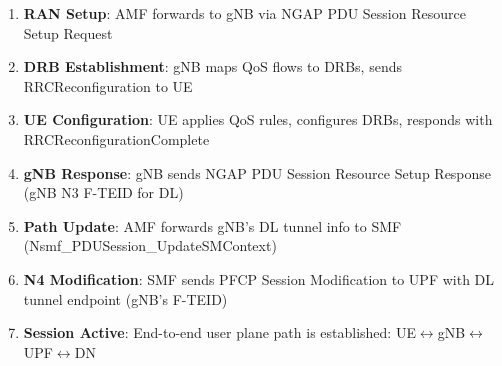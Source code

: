 \begin{enumerate}
  \begin{itemize}
  \tightlist
  \item
    N1 SM container: PDU Session Establishment Accept (IP addr, QoS rules, S-NSSAI)
  \item
    N2 SM container: PDU Session Resource Setup Request Transfer (UPF N3 TEID, QoS Profile)
  \end{itemize}
\item
  \textbf{RAN Setup}: AMF forwards to gNB via NGAP PDU Session Resource Setup Request
\item
  \textbf{DRB Establishment}: gNB maps QoS flows to DRBs, sends RRCReconfiguration to UE
\item
  \textbf{UE Configuration}: UE applies QoS rules, configures DRBs, responds with RRCReconfigurationComplete
\item
  \textbf{gNB Response}: gNB sends NGAP PDU Session Resource Setup Response (gNB N3 F-TEID for DL)
\item
  \textbf{Path Update}: AMF forwards gNB’s DL tunnel info to SMF (Nsmf\_\allowbreak{}PDUSession\_\allowbreak{}UpdateSMContext)
\item
  \textbf{N4 Modification}: SMF sends PFCP Session Modification to UPF with DL tunnel endpoint (gNB’s F-TEID)
\item
  \textbf{Session Active}: End-to-end user plane path is established: UE\ensuremath{\leftrightarrow}gNB\ensuremath{\leftrightarrow}UPF\ensuremath{\leftrightarrow}DN
\end{enumerate}








